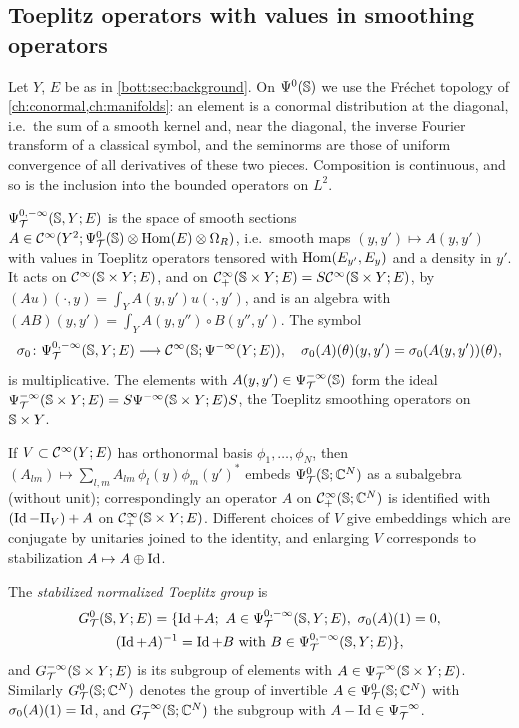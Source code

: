 \subsection{Toeplitz operators with values in smoothing operators}
Let $Y$, $E$ be as in \cref{bott:sec:background}. On $\Psi^{0}(\mathbb{S})$ we use the Fr\'echet
topology of \cref{ch:conormal,ch:manifolds}: an element is a conormal distribution at the
diagonal, i.e.\ the sum of a smooth kernel and, near the diagonal, the inverse Fourier
transform of a classical symbol, and the seminorms are those of uniform convergence of
all derivatives of these two pieces. Composition is continuous, and so is the inclusion
into the bounded operators on $L^2$.

\begin{definition}\label{bott:def:PsiTY}
  $\Psi^{0,-\infty}_{\mathcal{T}}(\mathbb{S},Y;E)$ is the space of smooth sections
  $A\in\mathcal{C}^\infty(Y^2;\Psi^{0}_{\mathcal{T}}(\mathbb{S})\otimes\operatorname{Hom}(E)\otimes\Omega_R)$, i.e.\ smooth maps
  $(y,y')\mapsto A(y,y')$ with values in Toeplitz operators tensored with
  $\operatorname{Hom}(E_{y'},E_y)$ and a density in $y'$. It acts on $\mathcal{C}^\infty(\mathbb{S}\times Y;E)$, and on
  $\mathcal{C}^\infty_+(\mathbb{S}\times Y;E)=S\mathcal{C}^\infty(\mathbb{S}\times Y;E)$, by
  $(Au)(\cdot,y)=\int_YA(y,y')u(\cdot,y')$, and is an algebra with
  $(AB)(y,y')=\int_YA(y,y'')\circ B(y'',y')$. The symbol
  \begin{equation*}
    \sigma_0\colon\Psi^{0,-\infty}_{\mathcal{T}}(\mathbb{S},Y;E)\longrightarrow\mathcal{C}^\infty(\mathbb{S};\Psi^{-\infty}(Y;E)),
    \quad\sigma_0(A)(\theta)(y,y')=\sigma_0(A(y,y'))(\theta),
  \end{equation*}
  is multiplicative. The elements with $A(y,y')\in\Psi^{-\infty}_{\mathcal{T}}(\mathbb{S})$ form the ideal
  $\Psi^{-\infty}_{\mathcal{T}}(\mathbb{S}\times Y;E)=S\Psi^{-\infty}(\mathbb{S}\times Y;E)S$, the Toeplitz
  smoothing operators on $\mathbb{S}\times Y$.
\end{definition}

If $V\subset\mathcal{C}^\infty(Y;E)$ has orthonormal basis $\phi_1,\dots,\phi_N$, then
$(A_{lm})\mapsto\sum_{l,m}A_{lm}\,\phi_l(y)\phi_m(y')^*$ embeds $\Psi^{0}_{\mathcal{T}}(\mathbb{S};\mathbb{C}^N)$ as a
subalgebra (without unit); correspondingly an operator $A$ on $\mathcal{C}^\infty_+(\mathbb{S};\mathbb{C}^N)$ is
identified with $(\operatorname{Id}-\Pi_V)+A$ on $\mathcal{C}^\infty_+(\mathbb{S}\times Y;E)$. Different choices of $V$ give
embeddings which are conjugate by unitaries joined to the identity, and enlarging $V$
corresponds to stabilization $A\mapsto A\oplus\operatorname{Id}$.

\begin{definition}\label{bott:def:GT}
  The \emph{stabilized normalized Toeplitz group} is
  \begin{multline*}
    \GT(\Sphere,Y;E)=\{\Id+A;\ A\in\PsiT{0,-\infty}(\Sphere,Y;E),\ \sigma_0(A)(1)=0,\\
    (\Id+A)^{-1}=\Id+B\text{ with }B\in\PsiT{0,-\infty}(\Sphere,Y;E)\},
  \end{multline*}
  and $G^{-\infty}_{\mathcal{T}}(\mathbb{S}\times Y;E)$ is its subgroup of elements with
  $A\in\Psi^{-\infty}_{\mathcal{T}}(\mathbb{S}\times Y;E)$. Similarly $G^{0}_{\mathcal{T}}(\mathbb{S};\mathbb{C}^N)$ denotes the group
  of invertible $A\in\Psi^{0}_{\mathcal{T}}(\mathbb{S};\mathbb{C}^N)$ with $\sigma_0(A)(1)=\operatorname{Id}$, and
  $G^{-\infty}_{\mathcal{T}}(\mathbb{S};\mathbb{C}^N)$ the subgroup with $A-\operatorname{Id}\in\Psi^{-\infty}_{\mathcal{T}}$.
\end{definition}

